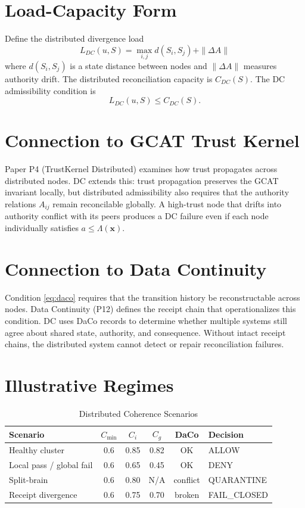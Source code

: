 \documentclass[letterpaper,10pt,conference]{ieeeconf}
\newcommand{\x}{\mathbf{x}}
\newcommand{\Lam}{\Lambda}
\begin{document}
\section{Load-Capacity Form}

Define the distributed divergence load
\[
L_{DC}(u, S) = \max_{i,j} d(S_i, S_j) + \|\Delta A\|
\]
where $d(S_i, S_j)$ is a state distance between nodes and $\|\Delta A\|$ measures authority drift. The distributed reconciliation capacity is $C_{DC}(S)$. The DC admissibility condition is
\[
L_{DC}(u, S) \le C_{DC}(S).
\]

\section{Connection to GCAT Trust Kernel}

Paper P4 (TrustKernel Distributed) examines how trust propagates across distributed nodes. DC extends this: trust propagation preserves the GCAT invariant locally, but distributed admissibility also requires that the authority relations $A_{ij}$ remain reconcilable globally. A high-trust node that drifts into authority conflict with its peers produces a DC failure even if each node individually satisfies $a \le \Lam(\x)$.

\section{Connection to Data Continuity}

Condition \eqref{eq:daco} requires that the transition history be reconstructable across nodes. Data Continuity (P12) defines the receipt chain that operationalizes this condition. DC uses DaCo records to determine whether multiple systems still agree about shared state, authority, and consequence. Without intact receipt chains, the distributed system cannot detect or repair reconciliation failures.

\section{Illustrative Regimes}

\begin{table}[h]
\centering
\caption{Distributed Coherence Scenarios}
\begin{tabular}{lccccl}
\hline
Scenario & $C_{\min}$ & $C_i$ & $C_g$ & DaCo & Decision \\
\hline
Healthy cluster & 0.6 & 0.85 & 0.82 & OK & ALLOW \\
Local pass / global fail & 0.6 & 0.65 & 0.45 & OK & DENY \\
Split-brain & 0.6 & 0.80 & N/A & conflict & QUARANTINE \\
Receipt divergence & 0.6 & 0.75 & 0.70 & broken & FAIL\_CLOSED \\
\hline
\end{tabular}
\end{table}
\end{document}
